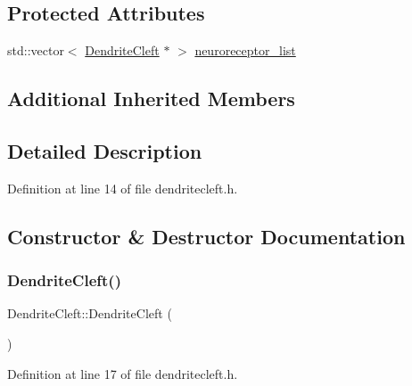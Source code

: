\subsection*{Protected Attributes}
\begin{DoxyCompactItemize}
\item 
std\+::vector$<$ \mbox{\hyperlink{class_dendrite_cleft}{Dendrite\+Cleft}} $\ast$ $>$ \mbox{\hyperlink{class_dendrite_cleft_a42de9c556ce58c9f511031361755a0c3}{neuroreceptor\+\_\+list}}
\end{DoxyCompactItemize}
\subsection*{Additional Inherited Members}


\subsection{Detailed Description}


Definition at line 14 of file dendritecleft.\+h.



\subsection{Constructor \& Destructor Documentation}
\mbox{\label{class_dendrite_cleft_a244a2e6377fafdf79df757d39a2684e5}} 
\subsubsection{\texorpdfstring{Dendrite\+Cleft()}{DendriteCleft()}\hspace{0.1cm}{\footnotesize\ttfamily [1/4]}}
{\footnotesize\ttfamily Dendrite\+Cleft\+::\+Dendrite\+Cleft (\begin{DoxyParamCaption}{ }\end{DoxyParamCaption})\hspace{0.3cm}{\ttfamily [inline]}}



Definition at line 17 of file dendritecleft.\+h.

\mbox{\label{class_dendrite_cleft_a335660dfc63f55980b2dcf8849568086}} 
